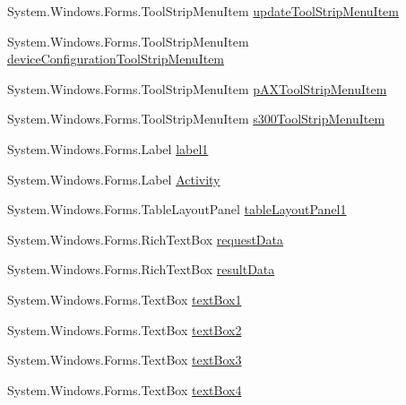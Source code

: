 \begin{DoxyCompactItemize}
System.\+Windows.\+Forms.\+Tool\+Strip\+Menu\+Item \mbox{\hyperlink{class_cert_complete_1_1_cert_complete_ad76ef267004a2881670e37ad056c23fc}{update\+Tool\+Strip\+Menu\+Item}}
\item 
System.\+Windows.\+Forms.\+Tool\+Strip\+Menu\+Item \mbox{\hyperlink{class_cert_complete_1_1_cert_complete_a07f81d00a0cf24b0c03055f3dea6e307}{device\+Configuration\+Tool\+Strip\+Menu\+Item}}
\item 
System.\+Windows.\+Forms.\+Tool\+Strip\+Menu\+Item \mbox{\hyperlink{class_cert_complete_1_1_cert_complete_a0a24d60f7e6d1bda7c2ba93d31c9a114}{p\+A\+X\+Tool\+Strip\+Menu\+Item}}
\item 
System.\+Windows.\+Forms.\+Tool\+Strip\+Menu\+Item \mbox{\hyperlink{class_cert_complete_1_1_cert_complete_adbe8c1e96b923c33474254fff4f99b63}{s300\+Tool\+Strip\+Menu\+Item}}
\item 
System.\+Windows.\+Forms.\+Label \mbox{\hyperlink{class_cert_complete_1_1_cert_complete_a2069bd962e50e8a9235af3b9faf9efb1}{label1}}
\item 
System.\+Windows.\+Forms.\+Label \mbox{\hyperlink{class_cert_complete_1_1_cert_complete_a44dfd0561d28a4c66e5c2ecb2c742088}{Activity}}
\item 
System.\+Windows.\+Forms.\+Table\+Layout\+Panel \mbox{\hyperlink{class_cert_complete_1_1_cert_complete_ac7810cb16e4147c70162cc6c80fc5517}{table\+Layout\+Panel1}}
\item 
System.\+Windows.\+Forms.\+Rich\+Text\+Box \mbox{\hyperlink{class_cert_complete_1_1_cert_complete_a629eb45333d126be3b651969b37b5308}{request\+Data}}
\item 
System.\+Windows.\+Forms.\+Rich\+Text\+Box \mbox{\hyperlink{class_cert_complete_1_1_cert_complete_aed4c3b9360f819cb59cc6720c4dd77d9}{result\+Data}}
\item 
System.\+Windows.\+Forms.\+Text\+Box \mbox{\hyperlink{class_cert_complete_1_1_cert_complete_a05a613a39788f778c3877b7f73b87992}{text\+Box1}}
\item 
System.\+Windows.\+Forms.\+Text\+Box \mbox{\hyperlink{class_cert_complete_1_1_cert_complete_a422c8734723a40be96e034f9ac7b5ad8}{text\+Box2}}
\item 
System.\+Windows.\+Forms.\+Text\+Box \mbox{\hyperlink{class_cert_complete_1_1_cert_complete_a38b6d7ce26a08d48b88e8a6ba70223c0}{text\+Box3}}
\item 
System.\+Windows.\+Forms.\+Text\+Box \mbox{\hyperlink{class_cert_complete_1_1_cert_complete_ae5e7f4a6656f82746e7aa684a97c655f}{text\+Box4}}
\item 

\end{DoxyCompactItemize}
